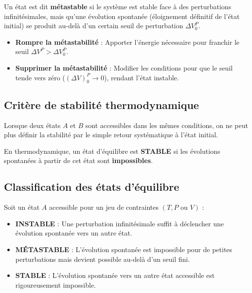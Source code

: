 \documentclass[french]{yLectureNote}
\begin{document}
\begin{definition}
Un état est dit \textbf{métastable} si le système est stable face à des perturbations infinitésimales, mais qu'une évolution spontanée (éloignement définitif de l'état initial) se produit au-delà d'un certain seuil de perturbation $\Delta V_0^P$.
\end{definition}


\begin{itemize}
    \item \textbf{Rompre la métastabilité} : Apporter l'énergie nécessaire pour franchir le seuil $\Delta V^P > \Delta V_0^P$.
    \item \textbf{Supprimer la métastabilité} : Modifier les conditions pour que le seuil tende vers zéro ($(\Delta V)_0^P \to 0$), rendant l'état instable.
\end{itemize}





\subsection{Critère de stabilité thermodynamique}

Lorsque deux états $A$ et $B$ sont accessibles dans les mêmes conditions, on ne peut plus définir la stabilité par le simple retour systématique à l'état initial.

\begin{definition}
En thermodynamique, un état d'équilibre est \textbf{STABLE} si les évolutions spontanées à partir de cet état sont \textbf{impossibles}. 
\end{definition}




\subsection{Classification des états d'équilibre}

\begin{definition}
Soit un état $A$ accessible pour un jeu de contraintes $(T, P \text{ ou } V)$ :
\begin{itemize}
    \item \textbf{INSTABLE} : Une perturbation infinitésimale suffit à déclencher une évolution spontanée vers un autre état.
    \item \textbf{MÉTASTABLE} : L'évolution spontanée est impossible pour de petites perturbations mais devient possible au-delà d'un seuil fini.
    \item \textbf{STABLE} : L'évolution spontanée vers un autre état accessible est rigoureusement impossible.
\end{itemize}
\end{definition}
\end{document}
